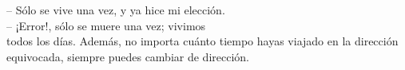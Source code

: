 \begin{flushright}
	\itshape
	\parbox[l]{2.9in}{
		-- Sólo se vive una vez, y ya hice mi elección.\\
		-- ¡Error!, sólo se muere una vez; vivimos\\todos los días. Además, no importa cuánto tiempo hayas viajado en la dirección equivocada, siempre puedes cambiar de dirección.
	}
\end{flushright}